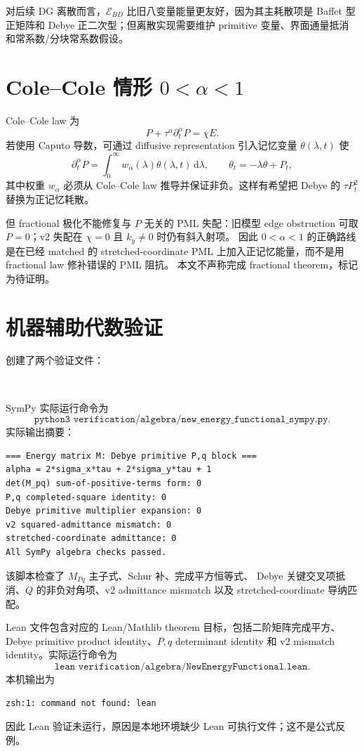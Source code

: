 \documentclass[UTF8,a4paper,11pt]{ctexart}
\newcommand{\dd}{\,\mathrm d}
\newcommand{\Ecal}{\mathcal E}
\begin{document}
对后续 DG 离散而言，\(\Ecal_{BD}\) 比旧八变量能量更友好，因为其主耗散项是
Baffet 型正矩阵和 Debye 正二次型；但离散实现需要维护 primitive 变量、界面通量抵消
和常系数/分块常系数假设。

\section{Cole--Cole 情形 \texorpdfstring{\(0<\alpha<1\)}{0<alpha<1}}

Cole--Cole law 为
\[
P+\tau^\alpha\partial_t^\alpha P=\chi E.
\]
若使用 Caputo 导数，可通过 diffusive representation 引入记忆变量
\(\theta(\lambda,t)\) 使
\[
\partial_t^\alpha P
=\int_0^\infty w_\alpha(\lambda)\theta(\lambda,t)\dd\lambda,\qquad
\theta_t=-\lambda\theta+P_t,
\]
其中权重 \(w_\alpha\) 必须从 Cole--Cole law 推导并保证非负。这样有希望把
Debye 的 \(\tau P_t^2\) 替换为正记忆耗散。

但 fractional 极化不能修复与 \(P\) 无关的 PML 失配：旧模型 edge obstruction
可取 \(P=0\)；v2 失配在 \(\chi=0\) 且 \(k_y\ne0\) 时仍有斜入射项。
因此 \(0<\alpha<1\) 的正确路线是在已经 matched 的 stretched-coordinate
PML 上加入正记忆能量，而不是用 fractional law 修补错误的 PML 阻抗。
本文不声称完成 fractional theorem，标记为待证明。

\section{机器辅助代数验证}

创建了两个验证文件：
\begin{center}
\\
\end{center}

SymPy 实际运行命令为
\[
\texttt{python3 verification/algebra/new\_energy\_functional\_sympy.py}.
\]
实际输出摘要：
\begin{verbatim}
=== Energy matrix M: Debye primitive P,q block ===
alpha = 2*sigma_x*tau + 2*sigma_y*tau + 1
det(M_pq) sum-of-positive-terms form: 0
P,q completed-square identity: 0
Debye primitive multiplier expansion: 0
v2 squared-admittance mismatch: 0
stretched-coordinate admittance: 0
All SymPy algebra checks passed.
\end{verbatim}
该脚本检查了 \(M_{Pq}\) 主子式、Schur 补、完成平方恒等式、
Debye 关键交叉项抵消、\(Q\) 的非负对角项、v2 admittance mismatch 以及
stretched-coordinate 导纳匹配。

Lean 文件包含对应的 Lean/Mathlib theorem 目标，包括二阶矩阵完成平方、
Debye primitive product identity、\(P,q\) determinant identity 和 v2 mismatch
identity。实际运行命令为
\[
\texttt{lean verification/algebra/NewEnergyFunctional.lean}.
\]
本机输出为
\begin{verbatim}
zsh:1: command not found: lean
\end{verbatim}
因此 Lean 验证未运行，原因是本地环境缺少 Lean 可执行文件；这不是公式反例。
\end{document}
